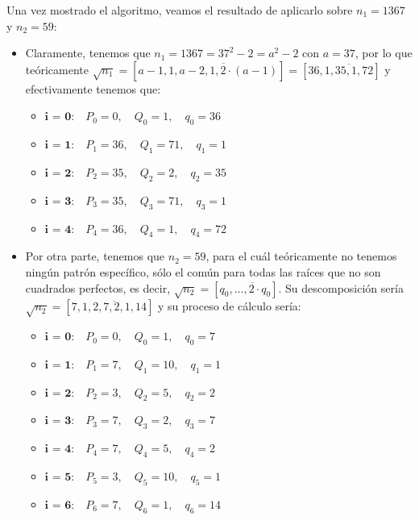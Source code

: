\begin{enumerate}
		Una vez mostrado el algoritmo, veamos el resultado de aplicarlo sobre $n_1 = 1367$ y $n_2 = 59$:
		\begin{itemize}
			\item Claramente, tenemos que $n_1 = 1367 = 37^2-2 = a^2 - 2$ con $a = 37$, por lo que teóricamente
			$\sqrt{n_1} = [a-1, \overline{1, a-2, 1, 2 \cdot (a-1)}] = [36, \overline{1, 35, 1, 72}]$ y efectivamente
			tenemos que:
			\begin{itemize}
				\item $\textbf{i = 0:} \quad P_0 = 0, \quad Q_0 = 1, \quad q_0 = 36$
				\item $\textbf{i = 1:} \quad P_1 = 36, \quad Q_1 = 71, \quad q_1 = 1$
				\item $\textbf{i = 2:} \quad P_2 = 35, \quad Q_2 = 2, \quad q_2 = 35$
				\item $\textbf{i = 3:} \quad P_3 = 35, \quad Q_3 = 71, \quad q_3 = 1$
				\item $\textbf{i = 4:} \quad P_4 = 36, \quad Q_4 = 1, \quad q_4 = 72$
			\end{itemize}
			
			\item Por otra parte, tenemos que $n_2 = 59$, para el cuál teóricamente no tenemos ningún patrón
			específico, sólo el común para todas las raíces que no son cuadrados perfectos, es decir, $\sqrt{n_2}
			= [q_0, \overline{\dots, 2 \cdot q_0}]$. Su descomposición sería $\sqrt{n_2} = [7, \overline{1, 2,
			7, 2, 1, 14}]$ y su proceso de cálculo sería:
			\begin{itemize}
				\item $\textbf{i = 0:} \quad P_0 = 0, \quad Q_0 = 1, \quad q_0 = 7$
				\item $\textbf{i = 1:} \quad P_1 = 7, \quad Q_1 = 10, \quad q_1 = 1$
				\item $\textbf{i = 2:} \quad P_2 = 3, \quad Q_2 = 5, \quad q_2 = 2$
				\item $\textbf{i = 3:} \quad P_3 = 7, \quad Q_3 = 2, \quad q_3 = 7$
				\item $\textbf{i = 4:} \quad P_4 = 7, \quad Q_4 = 5, \quad q_4 = 2$
				\item $\textbf{i = 5:} \quad P_5 = 3, \quad Q_5 = 10, \quad q_5 = 1$
				\item $\textbf{i = 6:} \quad P_6 = 7, \quad Q_6 = 1, \quad q_6 = 14$
			\end{itemize}
		\end{itemize}
		
	\end{enumerate}
